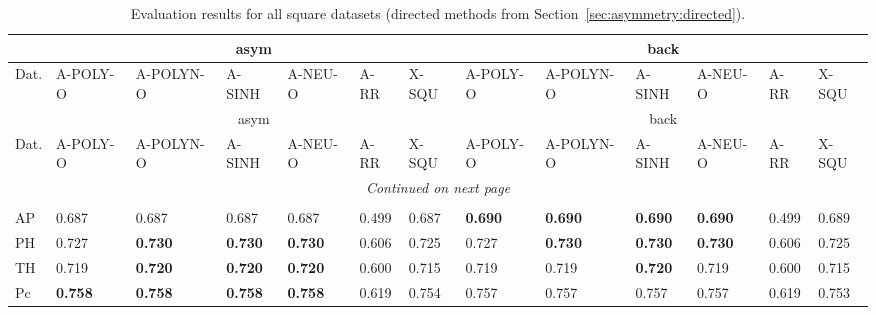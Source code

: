 
\begin{longtable}{ lllllllllllll }

\caption[Evaluation results for all square datasets (directed methods from Section~\ref{sec:asymmetry:directed})]{Evaluation results for all square datasets (directed methods from Section~\ref{sec:asymmetry:directed}).}  \\


\label{results-all-square2}
 & \multicolumn{6}{|c|}{\textrm{asym}} & \multicolumn{6}{|c}{\textrm{back}} \\
\hline

Dat.                   & A-POLY-O & A-POLYN-O & A-SINH & A-NEU-O & A-RR  & X-SQU & A-POLY-O & A-POLYN-O & A-SINH & A-NEU-O & A-RR  & X-SQU \\ 
\hline

\endfirsthead

 & \multicolumn{6}{|c|}{\textrm{asym}} & \multicolumn{6}{|c}{\textrm{back}} \\
\hline

\hline
Dat.                   & A-POLY-O & A-POLYN-O & A-SINH & A-NEU-O & A-RR  & X-SQU & A-POLY-O & A-POLYN-O & A-SINH & A-NEU-O & A-RR  & X-SQU \\ 
\hline

\endhead

\hline
\multicolumn{13}{c}{\textit{Continued on next page}} \\* 
\hline

\endfoot

\hline \hline
\endlastfoot

\hline
\multicolumn{13}{|l|}{\textbf{Authorship}} \\
\hline
\textsf{AP}                   & 0.687 & 0.687 & 0.687 & 0.687 & 0.499 & 0.687 & \bf{0.690} & \bf{0.690} & \bf{0.690} & \bf{0.690} & 0.499 & 0.689 \\
\textsf{PH}                   & 0.727 & \bf{0.730} & \bf{0.730} & \bf{0.730} & 0.606 & 0.725 & 0.727 & \bf{0.730} & \bf{0.730} & \bf{0.730} & 0.606 & 0.725 \\
\textsf{TH}                   & 0.719 & \bf{0.720} & \bf{0.720} & \bf{0.720} & 0.600 & 0.715 & 0.719 & 0.719 & \bf{0.720} & 0.719 & 0.600 & 0.715 \\
\textsf{Pc}                   & \bf{0.758} & \bf{0.758} & \bf{0.758} & \bf{0.758} & 0.619 & 0.754 & 0.757 & 0.757 & 0.757 & 0.757 & 0.619 & 0.753 \\


\end{longtable}
